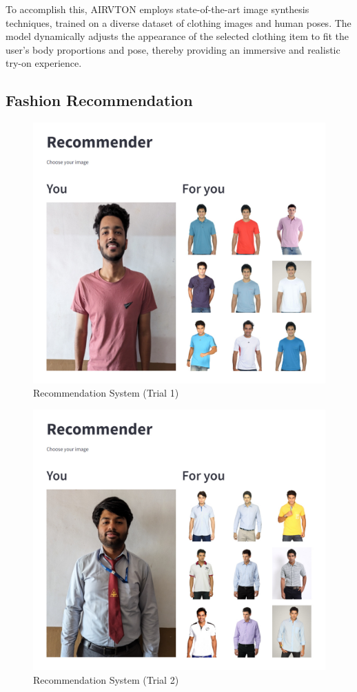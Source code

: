 	To accomplish this, AIRVTON employs state-of-the-art image synthesis techniques, trained on a diverse dataset of clothing images and human poses. The model dynamically adjusts the appearance of the selected clothing item to fit the user's body proportions and pose, thereby providing an immersive and realistic try-on experience.

    \subsection{Fashion Recommendation}
        \begin{figure}
            \centering
            \includegraphics[width=1\textwidth]{components/images/rec_1.jpg}
            \caption{Recommendation System (Trial 1)}
            \label{fig:recomm}
        \end{figure}
        \begin{figure}
            \centering
            \includegraphics[width=1\textwidth]{components/images/rec_2.jpg}
            \caption{Recommendation System (Trial 2)}
            \label{fig:recomm}
        \end{figure}
